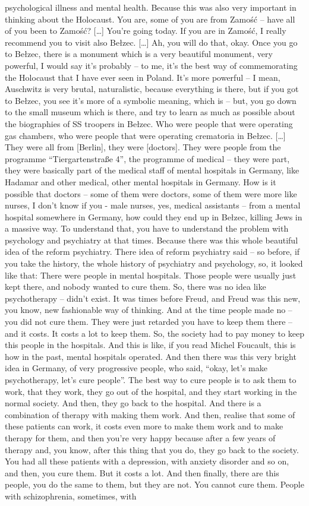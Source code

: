 psychological illness and mental health. Because this was also very important in thinking about the Holocaust. You are, some of you are from Zamość – have all of you been to Zamość? […] You’re going today. If you are in Zamość, I really recommend you to visit also Bełzec. […] Ah, you will do that, okay. Once you go to Bełzec, there is a monument which is a very beautiful monument, very powerful, I would say it’s probably – to me, it’s the best way of commemorating the Holocaust that I have ever seen in Poland. It’s more powerful – I mean, Auschwitz is very brutal, naturalistic, because everything is there, but if you got to Bełzec, you see it’s more of a symbolic meaning, which is – but, you go down to the small museum which is there, and try to learn as much as possible about the biographies of SS troopers in Bełzec. Who were people that were operating gas chambers, who were people that were operating crematoria in Bełzec. […] They were all from [Berlin], they were [doctors]. They were people from the programme “Tiergartenstraße 4”, the programme of medical – they were part, they were basically part of the medical staff of mental hospitals in Germany, like Hadamar and other medical, other mental hospitals in Germany. How is it possible that doctors – some of them were doctors, some of them were more like nurses, I don’t know if you - male nurses, yes, medical assistants – from a mental hospital somewhere in Germany, how could they end up in Bełzec, killing Jews in a massive way. To understand that, you have to understand the problem with psychology and psychiatry at that times. Because there was this whole beautiful idea of the reform psychiatry. There idea of reform psychiatry said – so before, if you take the history, the whole history of psychiatry and psychology, so, it looked like that: There were people in mental hospitals. Those people were usually just kept there, and nobody wanted to cure them. So, there was no idea like psychotherapy – didn’t exist. It was times before Freud, and Freud was this new, you know, new fashionable way of thinking. And at the time people made no – you did not cure them. They were just retarded you have to keep them there – and it costs. It costs a lot to keep them. So, the society had to pay money to keep this people in the hospitals. And this is like, if you read Michel Foucault, this is how in the past, mental hospitals operated. And then there was this very bright idea in Germany, of very progressive people, who said, “okay, let’s make psychotherapy, let’s cure people”. The best way to cure people is to ask them to work, that they work, they go out of the hospital, and they start working in the normal society. And then, they go back to the hospital. And there is a combination of therapy with making them work. And then, realise that some of these patients can work, it costs even more to make them work and to make therapy for them, and then you’re very happy because after a few years of therapy and, you know, after this thing that you do, they go back to the society. You had all these patients with a depression, with anxiety disorder and so on, and then, you cure them. But it costs a lot. And then finally, there are this people, you do the same to them, but they are not. You cannot cure them. People with schizophrenia, sometimes, with 